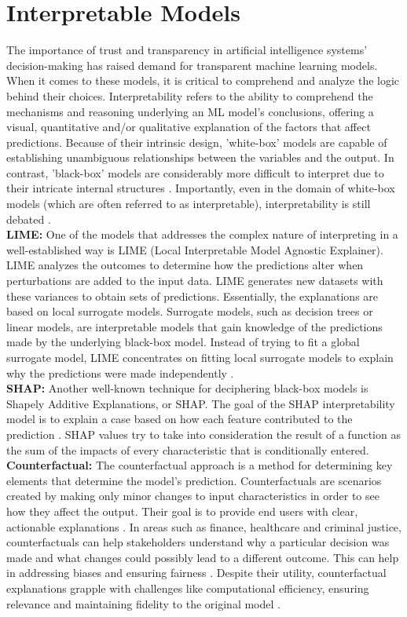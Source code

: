 \documentclass[a4paper,fleqn]{cas-sc}
\begin{document}
\section{Interpretable Models}
\label{sec:interpretable_models}
The importance of trust and transparency in artificial intelligence systems' decision-making has raised demand for transparent machine learning models. When it comes to these models, it is critical to comprehend and analyze the logic behind their choices. Interpretability refers to the ability to comprehend the mechanisms and reasoning underlying an ML model's conclusions, offering a visual, quantitative and/or qualitative explanation of the factors that affect predictions. Because of their intrinsic design, 'white-box' models are capable of establishing unambiguous relationships between the variables and the output. In contrast, 'black-box' models are considerably more difficult to interpret due to their intricate internal structures \cite{prabhu2023interpretation}. Importantly, even in the domain of white-box models (which are often referred to as interpretable), interpretability is still debated \cite{lipton2018mythos}.\\ 
\textbf{LIME:} One of the models that addresses the complex nature of interpreting in a well-established way is LIME (Local Interpretable Model Agnostic Explainer)\cite{prabhu2023interpretation}. LIME analyzes the outcomes to determine how the predictions alter when perturbations are added to the input data. LIME generates new datasets with these variances to obtain sets of predictions. Essentially, the explanations are based on local surrogate models. Surrogate models, such as decision trees or linear models, are interpretable models that gain knowledge of the predictions made by the underlying black-box model. Instead of trying to fit a global surrogate model, LIME concentrates on fitting local surrogate models to explain why the predictions were made independently \cite{ribeiro2016should}.\\
\textbf{SHAP:} Another well-known technique for deciphering black-box models is Shapely Additive Explanations, or SHAP. The goal of the SHAP interpretability model is to explain a case based on how each feature contributed to the prediction \cite{lundberg2017unified}. SHAP values try to take into consideration the result of a function as the sum of the impacts of every characteristic that is conditionally entered.\\
\textbf{Counterfactual:} The counterfactual approach is a method for determining key elements that determine the model's prediction. Counterfactuals are scenarios created by making only minor changes to input characteristics in order to see how they affect the output. Their goal is to provide end users with clear, actionable explanations \cite{wang2020counterfactual}. In areas such as finance, healthcare and criminal justice, counterfactuals can help stakeholders understand why a particular decision was made and what changes could possibly lead to a different outcome. This can help in addressing biases and ensuring fairness \cite{caruana2021counterfactual}. Despite their utility, counterfactual explanations grapple with challenges like computational efficiency, ensuring relevance and maintaining fidelity to the original model \cite{guidotti2018survey}.
\end{document}
